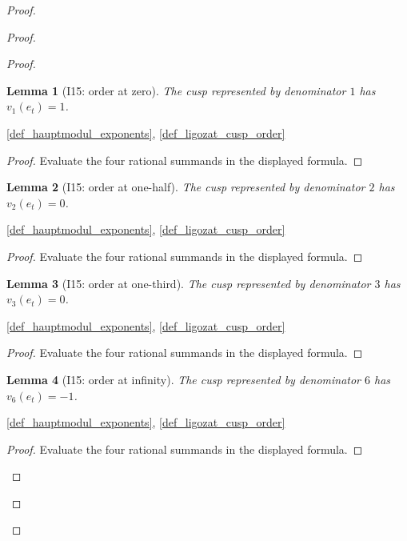 \documentclass[11pt,a4paper]{article}
\numberwithin{equation}{section}
\theoremstyle{plain}\newtheorem{theorem}{Theorem}[section]\newaliascnt{proposition}{theorem}\newtheorem{proposition}[proposition]{Proposition}\aliascntresetthe{proposition}\newaliascnt{lemma}{theorem}\newtheorem{lemma}[lemma]{Lemma}\aliascntresetthe{lemma}
\theoremstyle{definition}\newaliascnt{definition}{theorem}\newtheorem{definition}[definition]{Definition}\aliascntresetthe{definition}\newaliascnt{notation}{theorem}\newtheorem{notation}[notation]{Notation}\aliascntresetthe{notation}
\providecommand{\lean}[1]{}\providecommand{\leanok}{}
\begin{document}
\begin{proof}
\begin{proof}
\begin{proof}
\begin{lemma}[I15: order at zero]\label{lem_i15_order_zero}\lean{SptCM.CM.Repaired.hauptmodul_order_at_zero}\leanok
The cusp represented by denominator $1$ has $v_1(e_t)=1$.
\end{lemma}
\begin{uses-statement}\ref{def_hauptmodul_exponents}, \ref{def_ligozat_cusp_order}\end{uses-statement}
\begin{proof}Evaluate the four rational summands in the displayed formula.\end{proof}

\begin{lemma}[I15: order at one-half]\label{lem_i15_order_one_half}\lean{SptCM.CM.Repaired.hauptmodul_order_at_oneHalf}\leanok
The cusp represented by denominator $2$ has $v_2(e_t)=0$.
\end{lemma}
\begin{uses-statement}\ref{def_hauptmodul_exponents}, \ref{def_ligozat_cusp_order}\end{uses-statement}
\begin{proof}Evaluate the four rational summands in the displayed formula.\end{proof}

\begin{lemma}[I15: order at one-third]\label{lem_i15_order_one_third}\lean{SptCM.CM.Repaired.hauptmodul_order_at_oneThird}\leanok
The cusp represented by denominator $3$ has $v_3(e_t)=0$.
\end{lemma}
\begin{uses-statement}\ref{def_hauptmodul_exponents}, \ref{def_ligozat_cusp_order}\end{uses-statement}
\begin{proof}Evaluate the four rational summands in the displayed formula.\end{proof}

\begin{lemma}[I15: order at infinity]\label{lem_i15_order_infinity}\lean{SptCM.CM.Repaired.hauptmodul_order_at_infinity}\leanok
The cusp represented by denominator $6$ has $v_6(e_t)=-1$.
\end{lemma}
\begin{uses-statement}\ref{def_hauptmodul_exponents}, \ref{def_ligozat_cusp_order}\end{uses-statement}
\begin{proof}Evaluate the four rational summands in the displayed formula.\end{proof}


\end{proof}
\end{proof}
\end{proof}
\end{document}
